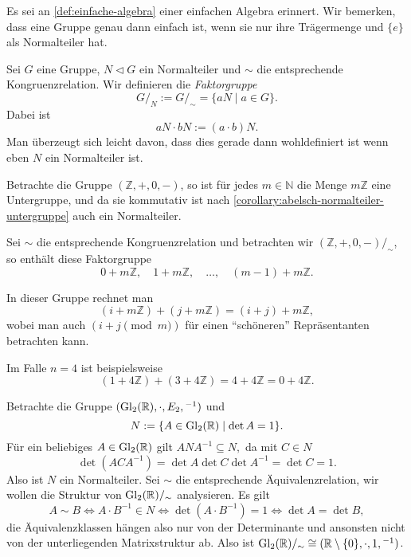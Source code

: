 \begin{remark}
    Es sei an \cref{def:einfache-algebra} einer einfachen Algebra erinnert. Wir bemerken, dass eine Gruppe genau dann einfach ist, wenn sie nur ihre Trägermenge und $\{e\}$ als Normalteiler hat.
\end{remark}

\begin{definition}
    Sei $G$ eine Gruppe, $N \vartriangleleft G$ ein Normalteiler und $\sim$ die entsprechende Kongruenzrelation. Wir definieren die \emph{Faktorgruppe} 
    $$ G /_N := G /_\sim = \{ aN \mid a \in G \}. $$
    Dabei ist
    $$ aN \cdot bN := (a \cdot b)N. $$
    Man überzeugt sich leicht davon, dass dies gerade dann wohldefiniert ist wenn eben $N$ ein Normalteiler ist.
\end{definition}

\begin{example}
    Betrachte die Gruppe $(\mathbb{Z}, +, 0, -)$, so ist für jedes $m \in \mathbb{N}$ die Menge $m \mathbb{Z}$ eine Untergruppe, und da sie kommutativ ist nach \cref{corollary:abelsch-normalteiler-untergruppe} auch ein Normalteiler.

    Sei $\sim$ die entsprechende Kongruenzrelation und betrachten wir $(\mathbb{Z}, +, 0, -)/_\sim$, so enthält diese Faktorgruppe
    $$ 0 + m\mathbb{Z}, \quad 1 + m\mathbb{Z}, \quad \hdots, \quad (m-1) + m\mathbb{Z}. $$

    In dieser Gruppe rechnet man
    $$ (i + m\mathbb{Z}) + (j + m\mathbb{Z}) = (i+j) + m\mathbb{Z}, $$
    wobei man auch $(i + j \pmod{m})$ für einen ``schöneren'' Repräsentanten betrachten kann.

    Im Falle $n = 4$ ist beispielsweise
    $$ (1 + 4\mathbb{Z}) + (3 + 4\mathbb{Z}) = 4 + 4\mathbb{Z} = 0 + 4\mathbb{Z}. $$
\end{example}

\begin{example}
    Betrachte die Gruppe $(\operatorname{Gl}_2(\mathbb{R}), \cdot, E_2, {}^{-1})$ und
    $$ N := \{ A \in \operatorname{Gl}_2(\mathbb{R}) \mid \det A = 1 \}. $$
    Für ein beliebiges $A \in \operatorname{Gl}_2(\mathbb{R})$ gilt $ A N A^{-1} \subseteq N, $ da mit $C \in N$
    $$ \det(A C A^{-1}) = \det A \det C \det A^{-1} = \det C = 1. $$
    Also ist $N$ ein Normalteiler. Sei $\sim$ die entsprechende Äquivalenzrelation, wir wollen die Struktur von $\operatorname{Gl}_2(\mathbb{R})/_\sim$ analysieren. Es gilt
    $$ A \sim B \Leftrightarrow A \cdot B^{-1} \in N \Leftrightarrow \det(A \cdot B^{-1}) = 1 \Leftrightarrow \det A = \det B, $$
    die Äquivalenzklassen hängen also nur von der Determinante und ansonsten nicht von der unterliegenden Matrixstruktur ab. Also ist $\operatorname{Gl}_2(\mathbb{R})/_\sim \cong (\mathbb{R} \setminus \{0\}, \cdot, 1, {}^{-1})$.
\end{example}

